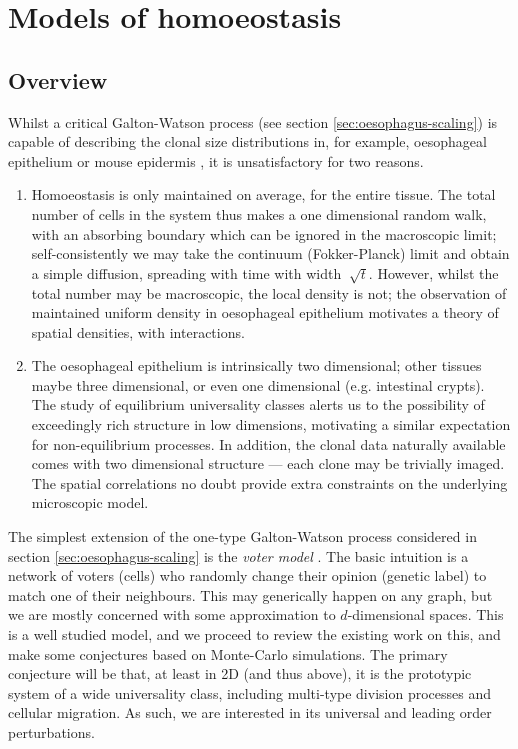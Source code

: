 \documentclass[10pt,english]{report}
\begin{document}
\chapter{Models of homoeostasis}

\section{Overview}

Whilst a critical Galton-Watson process (see section \ref{sec:oesophagus-scaling}) is capable of describing the clonal size distributions in, for example, oesophageal epithelium or mouse epidermis  \citep{klein08}, it is unsatisfactory for two reasons.

\begin{enumerate}
\item Homoeostasis is only maintained on average, for the entire tissue. The total number of cells in the system thus makes a one dimensional random walk, with an absorbing boundary which can be ignored in the macroscopic limit; self-consistently we may take the continuum (Fokker-Planck) limit and obtain a simple diffusion, spreading with time with width $~\sqrt{t}$. However, whilst the total number may be macroscopic, the local density is not; the observation of maintained uniform density in oesophageal epithelium motivates a theory of spatial densities, with interactions.

\item The oesophageal epithelium is intrinsically two dimensional; other tissues maybe three dimensional, or even one dimensional (e.g. intestinal crypts). The study of equilibrium universality classes alerts us to the possibility of exceedingly rich structure in low dimensions, motivating a similar expectation for non-equilibrium processes. In addition, the clonal data naturally available comes with two dimensional structure --- each clone may be trivially imaged. The spatial correlations no doubt provide extra constraints on the underlying microscopic model.

\end{enumerate}

The simplest extension of the one-type Galton-Watson process considered in section \ref{sec:oesophagus-scaling} is the \emph{voter model} \citep[][chapter V]{liggettbook}. The basic intuition is a network of voters (cells) who randomly change their opinion (genetic label) to match one of their neighbours. This may generically happen on any graph, but we are mostly concerned with some approximation to $d$-dimensional spaces. This is a well studied model, and we proceed to review the existing work on this, and make some conjectures based on Monte-Carlo simulations. The primary conjecture will be that, at least in 2D (and thus above), it is the prototypic system of a wide universality class, including multi-type division processes and cellular migration. As such, we are interested in its universal and leading order perturbations.
\end{document}
